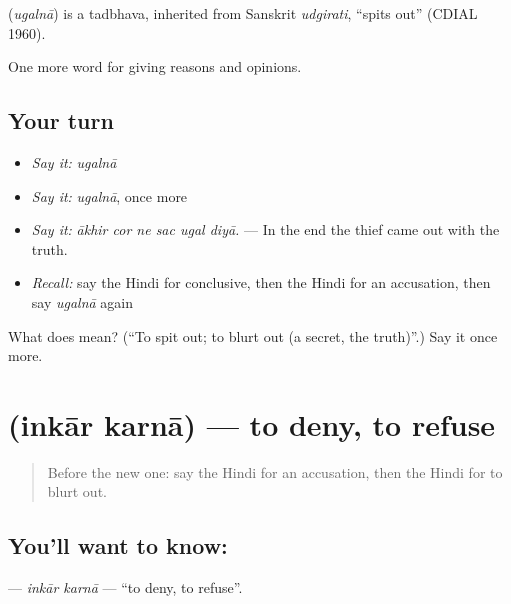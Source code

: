 \begin{cousinweb}
\textbf{} (\emph{ugalnā}) is a tadbhava, inherited from Sanskrit \emph{udgirati}, \textquotedblleft{}spits out\textquotedblright{} (CDIAL 1960).
\end{cousinweb}

\begin{grammarlens}[title={What you've built}]
One more word for giving reasons and opinions.
\end{grammarlens}

\subsection*{Your turn}
\begin{itemize}
\raggedright
  \item \emph{Say it:} \emph{ugalnā}
  \item \emph{Say it:} \emph{ugalnā}, once more
  \item \emph{Say it:} \emph{ākhir cor ne sac ugal diyā.} — In the end the thief came out with the truth.
  \item \emph{Recall:} say the Hindi for conclusive, then the Hindi for an accusation, then say \emph{ugalnā} again
\end{itemize}

\begin{tcolorbox}[breakable,colback=teal!4,colframe=teal!35!black,title={Before you move on}]
What does  mean? (\textquotedblleft{}To spit out; to blurt out (a secret, the truth)\textquotedblright{}.) Say it once more.
\end{tcolorbox}
\section[\texorpdfstring{\hi{इनकार} \hi{करना} (inkār karnā)}{इनकार करना (inkār karnā)}]{  (inkār karnā) — to deny, to refuse}

\label{lesson:HI-C349-inkarkarna}



\begin{quote}
Before the new one: say the Hindi for an accusation, then the Hindi for to blurt out.
\end{quote}

\subsection*{You'll want to know:  }
\textbf{ } — \emph{inkār karnā} — \textquotedblleft{}to deny, to refuse\textquotedblright{}.

